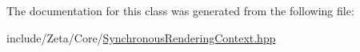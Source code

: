 The documentation for this class was generated from the following file\+:\begin{DoxyCompactItemize}
\item 
include/\+Zeta/\+Core/\hyperlink{SynchronousRenderingContext_8hpp}{Synchronous\+Rendering\+Context.\+hpp}\end{DoxyCompactItemize}
